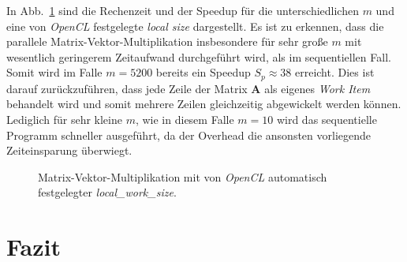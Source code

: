 \documentclass[
	ngerman,
	ruledheaders=section,
	class=report,
	thesis={type=Dokumentation},
	ignore-missing-data=true,
	accentcolor=9c,
	custommargins=false,
	marginpar=false,
	parskip=half-,
	fontsize=11pt,
]{tudapub}
\begin{document}
In Abb.~\ref{auto_lws} sind die Rechenzeit und der Speedup für die unterschiedlichen $m$ und eine von \textit{OpenCL} festgelegte \textit{local size} dargestellt. Es ist zu erkennen, dass die parallele Matrix-Vektor-Multiplikation insbesondere für sehr große $m$ mit wesentlich geringerem Zeitaufwand durchgeführt wird, als im sequentiellen Fall. Somit wird im Falle $m = 5200$ bereits ein Speedup $S_p \approx 38$ erreicht. Dies ist darauf zurückzuführen, dass jede Zeile der Matrix $\mathbf{A}$ als eigenes \textit{Work Item} behandelt wird und somit mehrere Zeilen gleichzeitig abgewickelt werden können. Lediglich für sehr kleine $m$, wie in diesem Falle $m = 10$ wird das sequentielle Programm schneller ausgeführt, da der Overhead die ansonsten vorliegende Zeiteinsparung überwiegt.
\begin{figure}[h!tb]
	\centering
	\hspace{1cm}
	\caption{Matrix-Vektor-Multiplikation mit von \textit{OpenCL} automatisch festgelegter \textit{local\_work\_size}.}
	\label{auto_lws}
\end{figure}

\chapter{Fazit}
\end{document}
